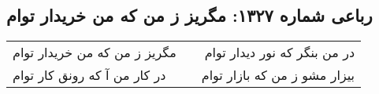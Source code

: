 \begin{center}
\section*{رباعی شماره ۱۳۲۷: مگریز ز من که من خریدار توام}
\label{sec:1327}
\begin{longtable}{l p{0.5cm} r}
مگریز ز من که من خریدار توام
&&
در من بنگر که نور دیدار توام
\\
در کار من آ که رونق کار توام
&&
بیزار مشو ز من که بازار توام
\\
\end{longtable}
\end{center}
